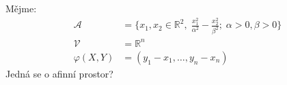 \begin{example}
    Mějme:
    \begin{align*}
        \mathcal{A} &= \{x_1, x_2 \in \mathbb{R}^2, \; \frac{x_1^2}{\alpha^2} - 
        \frac{x_2^2}{\beta^2}; \; \alpha > 0, \beta > 0 \}\\
        \mathcal{V} &= \mathbb{R}^n\\
        \varphi(X, Y) &= (y_1 - x_1, \ldots, y_n - x_n)
    \end{align*}
    Jedná se o afinní prostor?
\end{example}
